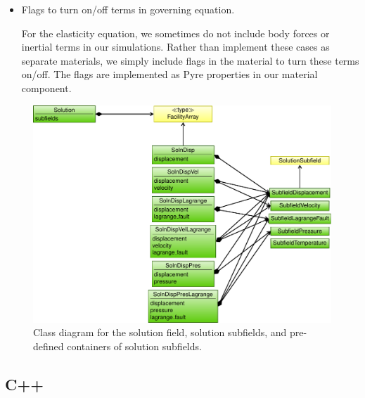 \begin{itemize}
  .

\item Flags to turn on/off terms in governing equation.

  For the elasticity equation, we sometimes do not include body forces
  or inertial terms in our simulations. Rather than implement these
  cases as separate materials, we simply include flags in the material
  to turn these terms on/off. The flags are implemented as Pyre
  properties in our material component.
\end{itemize}

\begin{figure}[htbp]
  \includegraphics[scale=0.8]{developer/figs/solution_classdiagram}
  \caption{Class diagram for the solution field, solution subfields,
    and pre-defined containers of solution subfields.}
  \label{fig:developer:solution:class}
\end{figure}

\subsection{C++}

